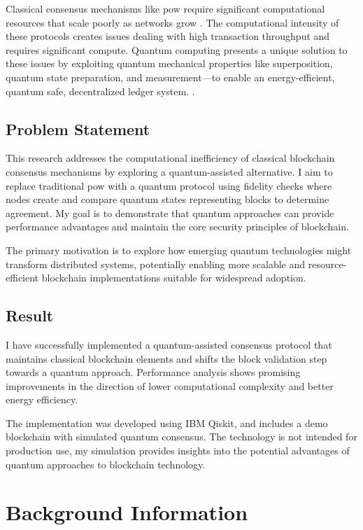 \documentclass[11pt,a4paper]{article}
\begin{document}
Classical consensus mechanisms like \gls{pow} require significant computational resources that scale poorly as networks grow \cite{investopedia_consensus}. The computational intensity of these protocols creates issues dealing with high transaction throughput and requires significant compute. Quantum computing presents a unique solution to these issues by exploiting quantum mechanical properties like superposition, quantum state preparation, and measurement—to enable an energy-efficient, quantum safe, decentralized ledger system. \cite{ibm_quantum}.

\subsection{Problem Statement}
This research addresses the computational inefficiency of classical blockchain consensus mechanisms by exploring a quantum-assisted alternative. I aim to replace traditional \gls{pow} with a quantum protocol using \gls{fidelity} checks where nodes create and compare quantum states representing blocks to determine agreement. My goal is to demonstrate that quantum approaches can provide performance advantages and maintain the core security principles of blockchain.

The primary motivation is to explore how emerging quantum technologies might transform distributed systems, potentially enabling more scalable and resource-efficient blockchain implementations suitable for widespread adoption.

\subsection{Result}
I have successfully implemented a quantum-assisted consensus protocol that maintains classical blockchain elements and shifts the block validation step towards a quantum approach. Performance analysis shows promising improvements in the direction of lower computational complexity and better energy efficiency.

The implementation was developed using IBM Qiskit, and includes a demo blockchain with simulated quantum consensus. The technology is not intended for production use, my simulation provides insights into the potential advantages of quantum approaches to blockchain technology.

\section{Background Information}
\end{document}
